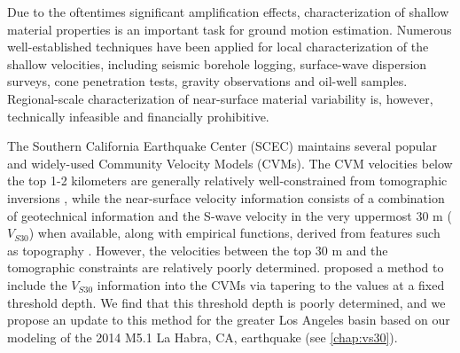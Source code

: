 Due to the oftentimes significant amplification effects, characterization of shallow material properties is an important task for ground motion estimation. Numerous well-established techniques have been applied for local characterization of the shallow velocities, including seismic borehole logging, surface-wave dispersion surveys, cone penetration tests, gravity observations and oil-well samples. Regional-scale characterization of near-surface material variability is, however, technically infeasible and financially prohibitive. 

The Southern California Earthquake Center (SCEC) maintains several popular and widely-used Community Velocity Models (CVMs). The CVM velocities below the top 1-2 kilometers are generally relatively well-constrained from tomographic inversions , while the near-surface velocity information consists of a combination of geotechnical information and the S-wave velocity in the very uppermost 30 m ($V_{S30}$) when available, along with empirical functions, derived from features such as topography . However, the velocities between the top 30 m and the tomographic constraints are relatively poorly determined. \citet{elyVs30derivedNearsurfaceSeismic2010} proposed a method to include the $V_{S30}$ information into the CVMs via tapering to the values at a fixed threshold depth. We find that this threshold depth is poorly determined, and we propose an update to this method for the greater Los Angeles basin based on our modeling of the 2014 M5.1 La Habra, CA, earthquake (see \cref{chap:vs30}). 



